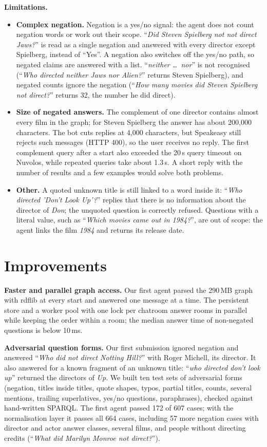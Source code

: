 \documentclass{article}
\begin{document}
\textbf{Limitations.}
\begin{itemize}
    \item \textbf{Complex negation.} Negation is a yes/no signal: the agent does not count negation words or work out their scope. ``\textit{Did Steven Spielberg not not direct Jaws?}'' is read as a single negation and answered with every director except Spielberg, instead of ``Yes''. A negation also switches off the yes/no path, so negated claims are answered with a list. ``\textit{neither \dots\ nor}'' is not recognised (``\textit{Who directed neither Jaws nor Alien?}'' returns Steven Spielberg), and negated counts ignore the negation (``\textit{How many movies did Steven Spielberg not direct?}'' returns 32, the number he did direct).
    \item \textbf{Size of negated answers.} The complement of one director contains almost every film in the graph; for Steven Spielberg the answer has about 200,000 characters. The bot cuts replies at 4,000 characters, but Speakeasy still rejects such messages (HTTP 400), so the user receives no reply. The first complement query after a start also exceeded the 20\,s query timeout on Nuvolos, while repeated queries take about 1.3\,s. A short reply with the number of results and a few examples would solve both problems.
    \item \textbf{Other.} A quoted unknown title is still linked to a word inside it: ``\textit{Who directed 'Don't Look Up'?}'' replies that there is no information about the director of \textit{Don}; the unquoted question is correctly refused. Questions with a literal value, such as ``\textit{Which movies came out in 1984?}'', are out of scope: the agent links the film \textit{1984} and returns its release date.
\end{itemize}

\section{Improvements}

\textbf{Faster and parallel graph access.} Our first agent parsed the 290\,MB graph with rdflib at every start and answered one message at a time. The persistent store and a worker pool with one lock per chatroom answer rooms in parallel while keeping the order within a room; the median answer time of non-negated questions is below 10\,ms.

\textbf{Adversarial question forms.} Our first submission ignored negation and answered ``\textit{Who did not direct Notting Hill?}'' with Roger Michell, its director. It also answered for a known fragment of an unknown title: ``\textit{who directed don't look up}'' returned the directors of \textit{Up}. We built ten test sets of adversarial forms (negation, titles inside titles, quote shapes, typos, partial titles, counts, several mentions, trailing superlatives, yes/no questions, paraphrases), checked against hand-written SPARQL. The first agent passed 172 of 607 cases; with the normalisation layer it passes all 664 cases, including 57 more negation cases with director and actor answer classes, several films, and people without directing credits (``\textit{What did Marilyn Monroe not direct?}'').
\end{document}
